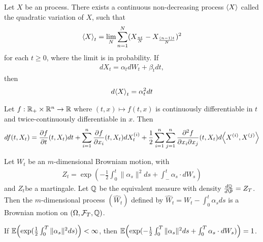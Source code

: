 \begin{thm}
  \label{sec:brown-moti-stoch-9}
  Let $X$ be an \ito process. There exists a continuous non-decreasing
  process $\IP{X}$ called the quadratic variation of $X$, such that
  \begin{align}
    \label{eq:18}
    \IP{X}_{t} = \lim_{N} \sum_{n=1}^{N} (X_{\frac{nt}{N}} - X_{\frac{(n-1)t}{N}})^{2}
  \end{align} for each $t \geq 0$, where the limit is in probability.
  If
  \begin{align}
    \label{eq:19}
    dX_{t} = \alpha_{t} dW_{t} + \beta_{t} dt,
  \end{align} then
  \begin{align}
    \label{eq:20}
    d \IP{X}_{t} = \alpha_{t}^{2} dt
  \end{align}
\end{thm}

\begin{thm}
  \label{sec:brown-moti-stoch-10}
  Let $f : \mathbb{R}_{+} \times \mathbb{R}^{n} \rightarrow \mathbb{R}$ where $(t, x) \mapsto
  f(t, x)$ is continuously differentiable in $t$ and
  twice-continuously differentiable in $x$.  Then
  \begin{align}
    \label{eq:21}
    df(t, X_{t}) = \frac{\partial f}{\partial t} (t, X_{t}) dt +
    \sum_{i=1}^{n} \frac{\partial f}{\partial x_{i}} (t, X_{t})
    dX_{t}^{(i)} + \frac{1}{2} \sum_{i=1}^{n} \sum_{j=1}^{n}
    \frac{\partial^{2} f}{\partial x_{i} \partial x_{j}}(t, X_{t}) d
    \IP{X^{(i)}, X^{(j)}}
  \end{align}
\end{thm}

\begin{thm}
  \label{sec:brown-moti-stoch-11}
  Let $W_{t}$ be an $m$-dimensional Browniam motion, with
  \begin{align}
    \label{eq:22}
    Z_{t} = \exp(-\frac{1}{2} \int_{0}^{t} \| \alpha_{s} \|^{2} ds +
    \int_{-}^{t} \alpha_{s} \cdot dW_{s})
  \end{align} and $Z_{t}$be a martingale.  Let $\Q$ be the equivalent
  measure with density $\frac{d\Q}{d\P} = Z_{T}$.  Then the
  $m$-dimensional process $(\hat W_{t})$ defined by $\hat W_{t} =
  W_{t} - \int_{0}^{t} \alpha_{s} ds$ is a Brownian motion on
  $(\Omega, \mathcal{F}_{T}, \Q)$.
\end{thm}

\begin{thm}
  \label{sec:brown-moti-stoch-12}
  If $\E{\exp(\frac{1}{2} \int_{0}^{T} \| \alpha_{s} \|^{2} ds)} <
  \infty$, then $\E{\exp(-\frac{1}{2} \int_{0}^{T} \|\alpha_{s}\|^{2}
    ds + \int_{0}^{T} \alpha_{s} \cdot dW_{s})} = 1$.
\end{thm}

